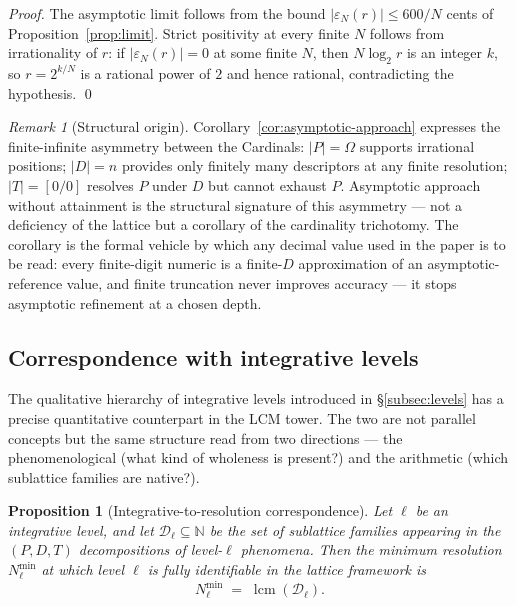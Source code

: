 \documentclass[11pt,a4paper]{article}
\newtheorem{proposition}[theorem]{Proposition}
\theoremstyle{definition}
\theoremstyle{remark}
\newtheorem{remark}[theorem]{Remark}
\newcommand{\N}{\mathbb{N}}
\DeclareMathOperator{\lcm}{lcm}
\begin{document}
\begin{proof}
The asymptotic limit follows from the bound $|\varepsilon_{N}(r)| \le 600/N$ cents of Proposition~\ref{prop:limit}. Strict positivity at every finite $N$ follows from irrationality of $r$: if $|\varepsilon_{N}(r)| = 0$ at some finite $N$, then $N \log_{2} r$ is an integer $k$, so $r = 2^{k/N}$ is a rational power of $2$ and hence rational, contradicting the hypothesis. \qed
\end{proof}

\begin{remark}[Structural origin]\label{rem:asymptotic-origin}
Corollary~\ref{cor:asymptotic-approach} expresses the finite-infinite asymmetry between the Cardinals: $|P| = \Omega$ supports irrational positions; $|D| = n$ provides only finitely many descriptors at any finite resolution; $|T|=[0/0]$ resolves $P$ under $D$ but cannot exhaust $P$. Asymptotic approach without attainment is the structural signature of this asymmetry --- not a deficiency of the lattice but a corollary of the cardinality trichotomy. The corollary is the formal vehicle by which any decimal value used in the paper is to be read: every finite-digit numeric is a finite-$D$ approximation of an asymptotic-reference value, and finite truncation never improves accuracy --- it stops asymptotic refinement at a chosen depth.
\end{remark}

\subsection{Correspondence with integrative levels}\label{subsec:levels-tower}

The qualitative hierarchy of integrative levels introduced in \S\ref{subsec:levels} has a precise quantitative counterpart in the LCM tower. The two are not parallel concepts but the same structure read from two directions --- the phenomenological (what kind of wholeness is present?) and the arithmetic (which sublattice families are native?).

\begin{proposition}[Integrative-to-resolution correspondence]\label{prop:int-resolution}
Let $\ell$ be an integrative level, and let $\mathcal{D}_{\ell}\subseteq\N$ be the set of sublattice families appearing in the $(P,D,T)$ decompositions of level-$\ell$ phenomena. Then the minimum resolution $N_{\ell}^{\min}$ at which level $\ell$ is fully identifiable in the lattice framework is
\[
\boxed{\;N_{\ell}^{\min} \;=\; \lcm(\mathcal{D}_{\ell}).\;}
\]
\end{proposition}
\end{document}
